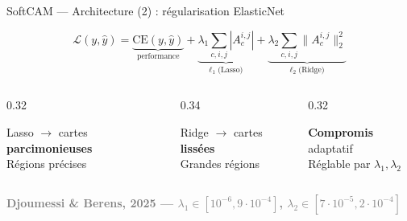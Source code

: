 \documentclass[10pt]{beamer}
\newcommand{\source}[1]{\vspace{4pt}\hfill{\textcolor{gray}{\textbf{\tiny #1}}}}
\begin{document}
\begin{frame}{SoftCAM — Architecture (2) : régularisation ElasticNet}
  \begin{tcolorbox}[colback=blue!3, colframe=blue!50!black, arc=2mm,
                    fonttitle=\bfseries, title=Loss augmentée (Eq. 5 de l'article)]
    \[
      \mathcal{L}(y, \hat y) = \underbrace{\text{CE}(y,\hat y)}_{\text{performance}}
        + \underbrace{\lambda_1 \!\!\sum_{c,i,j}\! |A^{i,j}_c|}_{\ell_1\;\text{(Lasso)}}
        + \underbrace{\lambda_2 \!\!\sum_{c,i,j}\! \|A^{i,j}_c\|_2^2}_{\ell_2\;\text{(Ridge)}}
    \]
  \end{tcolorbox}

  \begin{columns}
    \begin{column}{0.32\textwidth}
      \begin{tcolorbox}[colback=orange!3, colframe=orange!60!black, arc=2mm,
                        fonttitle=\bfseries, title=Sparse ($\lambda_1>0$),
                        halign title=center]
        \centering
        Lasso $\to$ cartes \textbf{parcimonieuses}\\
        Régions précises
      \end{tcolorbox}
    \end{column}
    \begin{column}{0.34\textwidth}
      \begin{tcolorbox}[colback=blue!3, colframe=blue!50!black, arc=2mm,
                        fonttitle=\bfseries, title=Dense ($\lambda_2>0$),
                        halign title=center]
        \centering
        Ridge $\to$ cartes \textbf{lissées}\\
        Grandes régions
      \end{tcolorbox}
    \end{column}
    \begin{column}{0.32\textwidth}
      \begin{tcolorbox}[colback=green!3, colframe=green!60!black, arc=2mm,
                        fonttitle=\bfseries, title=ElasticNet,
                        halign title=center]
        \centering
        \textbf{Compromis} adaptatif\\
        Réglable par $\lambda_1, \lambda_2$
      \end{tcolorbox}
    \end{column}
  \end{columns}
  \source{Djoumessi \& Berens, 2025 --- $\lambda_1\!\in\![10^{-6},9{\cdot}10^{-4}]$, $\lambda_2\!\in\![7{\cdot}10^{-5},2{\cdot}10^{-4}]$}
\end{frame}
\end{document}
